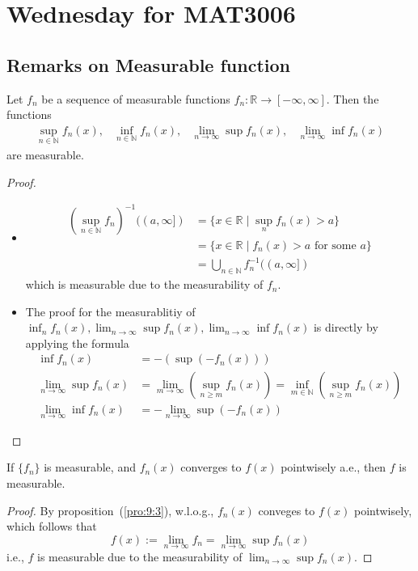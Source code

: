 
\section{Wednesday for MAT3006}
\subsection{Remarks on Measurable function}

\begin{proposition}
Let $f_n$ be a sequence of measurable functions $f_n:\mathbb{R}\to[-\infty,\infty]$.
Then the functions
\[
\begin{array}{llll}
\sup_{n\in\mathbb{N}}f_n(x),
&
\inf_{n\in\mathbb{N}}f_n(x),
&
\lim_{n\to\infty}\sup f_n(x),
&
\lim_{n\to\infty}\inf f_n(x)
\end{array}
\]
are measurable.
\end{proposition}
\begin{proof}
\begin{itemize}
\item
\begin{align*}
\left(\sup_{n\in\mathbb{N}}f_n\right)^{-1}((a,\infty])&=\{x\in\mathbb{R}\mid \sup_n f_n(x)>a\}\\
&=\{x\in\mathbb{R}\mid f_n(x)>a\text{ for some $a$}\}\\
&=\bigcup_{n\in\mathbb{N}}f_n^{-1}((a,\infty])
\end{align*}
which is measurable due to the measurability of $f_n$.
\item
The proof for the measurablitiy of $\inf_nf_n(x),\lim_{n\to\infty}\sup f_n(x),\lim_{n\to\infty}\inf f_n(x)$ is directly by applying the formula
\begin{align*}
\inf f_n(x) &= -(\sup (-f_n(x)))\\
\lim_{n\to\infty}\sup f_n(x) &= \lim_{m\to\infty}(\sup_{n\ge m}f_n(x))=\inf_{m\in\mathbb{N}}(\sup_{n\ge m}f_n(x))\\
\lim_{n\to\infty}\inf f_n(x) &=-\lim_{n\to\infty}\sup (-f_n(x))
\end{align*}
\end{itemize}
\end{proof}


\begin{corollary}
If $\{f_n\}$ is measurable, and $f_n(x)$ converges to $f(x)$ pointwisely a.e., then $f$ is measurable.
\end{corollary}
\begin{proof}
By proposition~(\ref{pro:9:3}), w.l.o.g., $f_n(x)$ conveges to $f(x)$ pointwisely, which follows that
\[
f(x) := \lim_{n\to\infty}f_n = \lim_{n\to\infty}\sup f_n(x)
\]
i.e., $f$ is measurable due to the measurability of $\lim_{n\to\infty}\sup f_n(x)$.
\end{proof}


